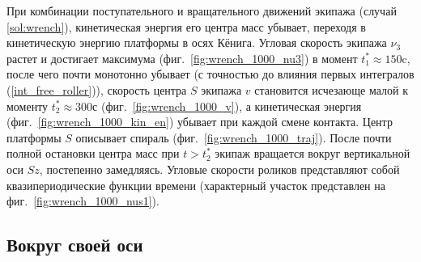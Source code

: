 При комбинации поступательного и вращательного движений экипажа (случай \ref{sol:wrench}), кинетическая энергия его центра масс убывает, переходя в кинетическую энергию платформы в осях Кёнига.
Угловая скорость экипажа $\nu_3$ растет и достигает максимума (фиг.~\ref{fig:wrench_1000_nu3}) в момент $t^*_1 \approx 150$c, после чего почти монотонно убывает (с точностью до влияния первых интегралов (\ref{int_free_roller})), скорость центра $S$ экипажа $v$ становится исчезающе малой к моменту $t^*_2 \approx 300$с (фиг.~\ref{fig:wrench_1000_v}), а кинетическая энергия (фиг.~\ref{fig:wrench_1000_kin_en}) убывает при каждой смене контакта. Центр платформы $S$ описывает спираль (фиг.~\ref{fig:wrench_1000_traj}). После почти полной остановки центра масс при  $t > t^*_2$ экипаж вращается вокруг вертикальной оси $Sz$, постепенно замедляясь. Угловые скорости роликов представляют собой квазипериодические функции времени (характерный участок представлен на фиг.~\ref{fig:wrench_1000_nus1}).

\newpage

\subsection{Вокруг своей оси}

